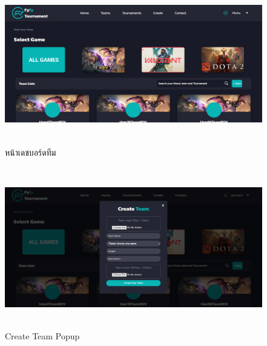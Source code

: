     \begin{figure}[ht]
      \begin{center}
      \includegraphics[width=18cm,height=7cm,keepaspectratio]{team.png}
      \end{center}
      \caption[หน้าเดชบอร์ดทีม]{หน้าเดชบอร์ดทีม}
      \label{fig:หน้าเดชบอร์ดทีม}
    \end{figure}
    \begin{figure}[ht]
      \begin{center}
      \includegraphics[width=18cm,height=7cm,keepaspectratio]{team_create.png}
      \end{center}
      \caption[Create Team Popup]{Create Team Popup}
      \label{fig:Create Team Popup}
    \end{figure}

